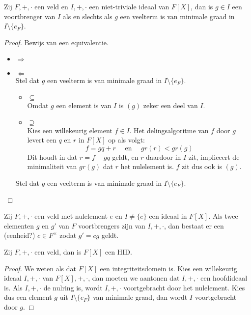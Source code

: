 \documentclass[main.tex]{subfiles}
\begin{document}
\begin{lem}
  \label{lem:minimale-veelterm-brengt-ideaal-voort}
  Zij $F,+,\cdot$ een veld en $I,+,\cdot$ een niet-triviale ideaal van $F[X]$, dan is $g\in I$ een voortbrenger van $I$ als en slechts als $g$ een veelterm is van minimale graad in $I\setminus \{e_{F}\}$.

  \begin{proof}
    Bewijs van een equivalentie.
    \begin{itemize}
    \item $\Rightarrow$\\
    \item $\Leftarrow$\\
      Stel dat $g$ een veelterm is van minimale graad in $I\setminus \{e_{F}\}$.
      \begin{itemize}
      \item $\subseteq$\\
        Omdat $g$ een element is van $I$ is $(g)$ zeker een deel van $I$.
      \item $\supseteq$\\
        Kies een willekeurig element $f\in I$.
        Het delingsalgoritme van $f$ door $g$ levert een $q$ en $r$ in $F[X]$ op als volgt:
        \[ f = gq + r \quad\text{ en }\quad gr(r) < gr(g) \]
        Dit houdt in dat $r=f-gq$ geldt, en $r$ daardoor in $I$ zit, impliceert de minimaliteit van $gr(g)$ dat $r$ het nulelement is.
        $f$ zit dus ook is $(g)$.
      \end{itemize}
      Stel dat $g$ een veelterm is van minimale graad in $I\setminus \{e_{F}\}$.
    \end{itemize}
  \end{proof}
\end{lem}

\begin{st}
  \label{st:minimale-veeltermen-bijna-uniek}
  Zij $F,+,\cdot$ een veld met nulelement $e$ en $I \neq \{e\}$ een ideaal in $F[X]$.
  Als twee elementen $g$ en $g'$ van $F$ voortbrengers zijn van $I,+,\cdot$, dan bestaat er een (eenheid?) $c\in F^{\times}$ zodat $g'=cg$ geldt.
\end{st}


\begin{st}
  \label{st:veeltermen-over-veld-hid}
  Zij $F,+,\cdot$ een veld, dan is $F[X]$ een HID.

  \begin{proof}
    We weten als dat $F[X]$ een integriteitsdomein is.
    Kies een willekeurig ideaal $I,+,\cdot$ van $F[X],+,\cdot$, dan moeten we aantonen dat $I,+,\cdot$ een hoofdideaal is.
    Als $I,+,\cdot$ de nulring is, wordt $I,+,\cdot$ voortgebracht door het nulelement.
    Kies dus een element $g$ uit $I\setminus \{e_{F}\}$ van minimale graad, dan wordt $I$ voortgebracht door $g$.
  \end{proof}
\end{st}
\end{document}
